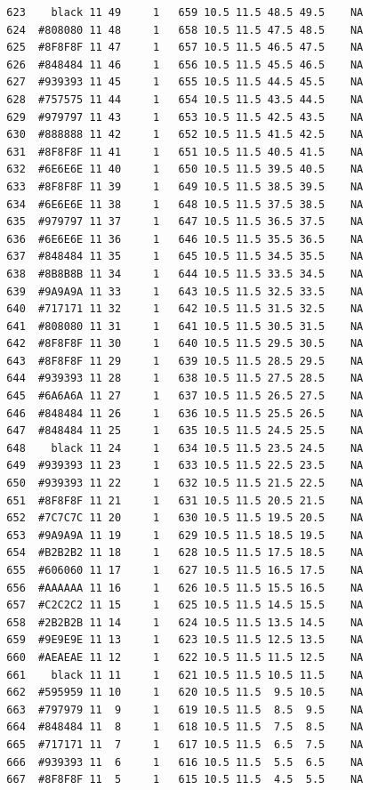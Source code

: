 \documentclass[12pt,twoside]{reedthesis}
\begin{document}
\begin{verbatim}
  623    black 11 49     1   659 10.5 11.5 48.5 49.5    NA
  624  #808080 11 48     1   658 10.5 11.5 47.5 48.5    NA
  625  #8F8F8F 11 47     1   657 10.5 11.5 46.5 47.5    NA
  626  #848484 11 46     1   656 10.5 11.5 45.5 46.5    NA
  627  #939393 11 45     1   655 10.5 11.5 44.5 45.5    NA
  628  #757575 11 44     1   654 10.5 11.5 43.5 44.5    NA
  629  #979797 11 43     1   653 10.5 11.5 42.5 43.5    NA
  630  #888888 11 42     1   652 10.5 11.5 41.5 42.5    NA
  631  #8F8F8F 11 41     1   651 10.5 11.5 40.5 41.5    NA
  632  #6E6E6E 11 40     1   650 10.5 11.5 39.5 40.5    NA
  633  #8F8F8F 11 39     1   649 10.5 11.5 38.5 39.5    NA
  634  #6E6E6E 11 38     1   648 10.5 11.5 37.5 38.5    NA
  635  #979797 11 37     1   647 10.5 11.5 36.5 37.5    NA
  636  #6E6E6E 11 36     1   646 10.5 11.5 35.5 36.5    NA
  637  #848484 11 35     1   645 10.5 11.5 34.5 35.5    NA
  638  #8B8B8B 11 34     1   644 10.5 11.5 33.5 34.5    NA
  639  #9A9A9A 11 33     1   643 10.5 11.5 32.5 33.5    NA
  640  #717171 11 32     1   642 10.5 11.5 31.5 32.5    NA
  641  #808080 11 31     1   641 10.5 11.5 30.5 31.5    NA
  642  #8F8F8F 11 30     1   640 10.5 11.5 29.5 30.5    NA
  643  #8F8F8F 11 29     1   639 10.5 11.5 28.5 29.5    NA
  644  #939393 11 28     1   638 10.5 11.5 27.5 28.5    NA
  645  #6A6A6A 11 27     1   637 10.5 11.5 26.5 27.5    NA
  646  #848484 11 26     1   636 10.5 11.5 25.5 26.5    NA
  647  #848484 11 25     1   635 10.5 11.5 24.5 25.5    NA
  648    black 11 24     1   634 10.5 11.5 23.5 24.5    NA
  649  #939393 11 23     1   633 10.5 11.5 22.5 23.5    NA
  650  #939393 11 22     1   632 10.5 11.5 21.5 22.5    NA
  651  #8F8F8F 11 21     1   631 10.5 11.5 20.5 21.5    NA
  652  #7C7C7C 11 20     1   630 10.5 11.5 19.5 20.5    NA
  653  #9A9A9A 11 19     1   629 10.5 11.5 18.5 19.5    NA
  654  #B2B2B2 11 18     1   628 10.5 11.5 17.5 18.5    NA
  655  #606060 11 17     1   627 10.5 11.5 16.5 17.5    NA
  656  #AAAAAA 11 16     1   626 10.5 11.5 15.5 16.5    NA
  657  #C2C2C2 11 15     1   625 10.5 11.5 14.5 15.5    NA
  658  #2B2B2B 11 14     1   624 10.5 11.5 13.5 14.5    NA
  659  #9E9E9E 11 13     1   623 10.5 11.5 12.5 13.5    NA
  660  #AEAEAE 11 12     1   622 10.5 11.5 11.5 12.5    NA
  661    black 11 11     1   621 10.5 11.5 10.5 11.5    NA
  662  #595959 11 10     1   620 10.5 11.5  9.5 10.5    NA
  663  #797979 11  9     1   619 10.5 11.5  8.5  9.5    NA
  664  #848484 11  8     1   618 10.5 11.5  7.5  8.5    NA
  665  #717171 11  7     1   617 10.5 11.5  6.5  7.5    NA
  666  #939393 11  6     1   616 10.5 11.5  5.5  6.5    NA
  667  #8F8F8F 11  5     1   615 10.5 11.5  4.5  5.5    NA

\end{verbatim}
\end{document}
